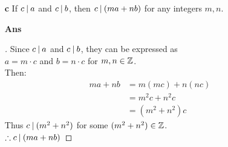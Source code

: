 \documentclass[paper=usletter, fontsize=12pt]{article}
\begin{document}
\begin{itemize}
\begin{itemize}
\begin{itemize}
                \item[\textbf{c}] If $c \:\vert\: a$ and $c \:\vert\: b$, then $c
                \:\vert\: (ma + nb)$ for any integers $m, n$.
                \item[\textbf{Ans}]
                \begin{proof}[\unskip\nopunct]
                    Since $c \:\vert\: a$ and $c \:\vert\: b$, they can be expressed
                    as \\ $a = m \cdot c$ and $b = n \cdot c$ for $m, n \in
                    \mathbb{Z}$. \\
                    Then:
                    \begin{align*}
                        ma + nb & = m(mc) + n(nc) \\
                        & = m^2c + n^2c \\
                        & = (m^2 + n^2)c
                    \end{align*}
                    Thus $c \:\vert\: (m^2 + n^2)$ for some $(m^2 + n^2)
                    \in \mathbb{Z}$. \\
                    $\therefore c \:\vert\: (ma + nb)$ \qedhere
                \end{proof}
                \vspace{0.2in}

            \end{itemize}


\end{itemize}
\end{itemize}
\end{document}
